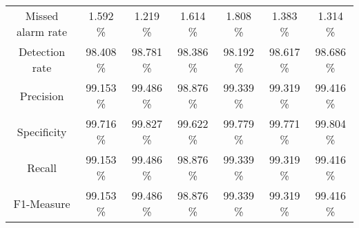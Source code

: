 \begin{table}[htb]
\begin{tabular}{@{}ccccccc@{}}
        Missed alarm rate &  1.592 \% &  1.219 \% &  1.614 \% &  1.808 \% &  1.383 \% &  1.314 \% \\
        Detection rate &  98.408 \% &  98.781 \% &  98.386 \% &  98.192 \% &  98.617 \% &  98.686 \% \\
        Precision &  99.153 \% &  99.486 \% &  98.876 \% &  99.339 \% &  99.319 \% &  99.416 \% \\
        Specificity &  99.716 \% &  99.827 \% &  99.622 \% &  99.779 \% &  99.771 \% &  99.804 \% \\
        Recall &  99.153 \% &  99.486 \% &  98.876 \% &  99.339 \% &  99.319 \% &  99.416 \% \\
        F1-Measure &  99.153 \% &  99.486 \% &  98.876 \% &  99.339 \% &  99.319 \% &  99.416 \% \\
        \bottomrule
    \end{tabular}
\end{table}